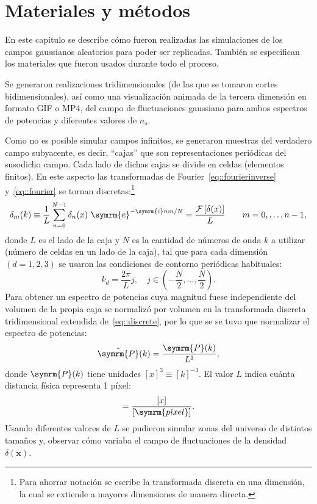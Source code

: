 \chapter{Materiales y métodos}\label{ch::mym}
En este capítulo se describe cómo fueron realizadas las simulaciones de los campos gaussianos aleatorios para poder ser replicadas. También se especifican los materiales que fueron usados durante todo el proceso.

Se generaron realizaciones tridimensionales (de las que se tomaron cortes bidimensionales), así como una visualización animada de la tercera dimensión en formato GIF o MP4, del campo de fluctuaciones gaussiano para ambos espectros de potencias y diferentes valores de \(n_s\).

Como no es posible simular campos infinitos, se generaron muestras del verdadero campo subyacente, es decir, ``cajas'' que son representaciones periódicas del susodicho campo. Cada lado de dichas cajas se divide en celdas (elementos finitos). En este aspecto las transformadas de Fourier~\eqref{eq::fourierinverse} y~\eqref{eq::fourier} se tornan discretas:\footnote{Para ahorrar notación se escribe la transformada discreta en una dimensión, la cual se extiende a mayores dimensiones de manera directa.}
\begin{equation}
    \delta_m(k)\equiv\frac{1}{L}\sum_{n=0}^{N-1}\delta_n(x)\ \symrm{e}^{-\symrm{i}nm/N}=\frac{\mathcal{F}\left[\delta({x})\right]}{L}\qquad m=0,\ldots,n-1,\label{eq::discrete}
\end{equation}
donde \(L\) es el lado de la caja y \(N\) es la cantidad de números de onda \(k\) a utilizar (número de celdas en un lado de la caja), tal que para cada dimensión \((d=1,2,3)\) se usaron las condiciones de contorno periódicas habituales:
\begin{equation}
    k_d=\frac{2\pi}{L}j,\quad j\in\left(-\frac{N}{2},\ldots,\frac{N}{2}\right).\label{eq::knumbers}
\end{equation}
Para obtener un espectro de potencias cuya magnitud fuese independiente del volumen de la propia caja se normalizó por volumen en la transformada discreta tridimensional extendida de~\eqref{eq::discrete}, por lo que se se tuvo que normalizar el espectro de potencias:
\begin{equation}
    \tilde{\symrm{P}}(k)=\frac{\symrm{P}(k)}{L^3},
\end{equation}
donde \({\symrm{P}}(k)\) tiene unidades \([x]^3\equiv[k]^{-3}\). El valor \(L\) indica cuánta distancia física representa 1 píxel:
\begin{equation}
    [L]=\frac{[x]}{[\symrm{p\acute{\imath}xel}]}.
\end{equation}
Usando diferentes valores de \(L\) se pudieron simular zonas del universo de distintos tamaños y, observar cómo variaba el campo de fluctuaciones de la densidad \(\delta(\symbf{x})\).
